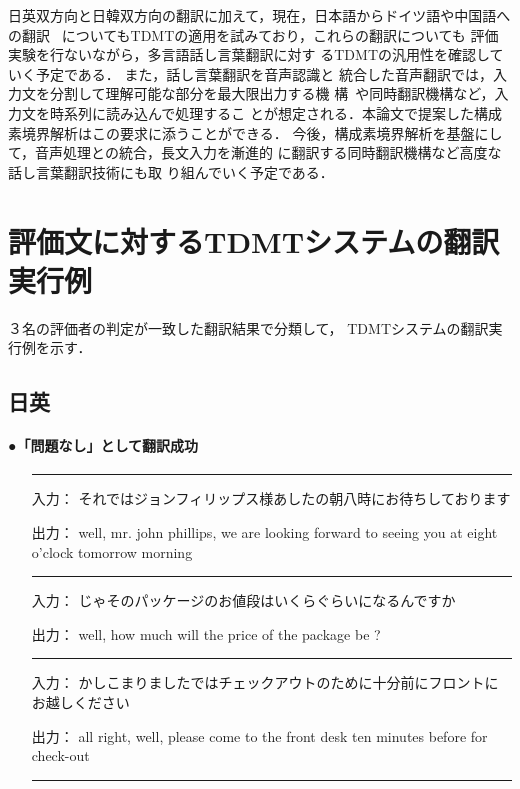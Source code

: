 日英双方向と日韓双方向の翻訳に加えて，現在，日本語からドイツ語や中国語への翻訳~\cite{Paul,Yamamoto99}
についてもTDMTの適用を試みており，これらの翻訳についても
評価実験を行ないながら，多言語話し言葉翻訳に対す
るTDMTの汎用性を確認していく予定である．
また，話し言葉翻訳を音声認識と
統合した音声翻訳では，入力文を分割して理解可能な部分を最大限出力する機
構~\cite{Furuse98}や同時翻訳機構など，入力文を時系列に読み込んで処理するこ
とが想定される．本論文で提案した構成素境界解析はこの要求に添うことができる．
今後，構成素境界解析を基盤にして，音声処理との統合，長文入力を漸進的
に翻訳する同時翻訳機構など高度な話し言葉翻訳技術にも取
り組んでいく予定である．




\clearpage
\appendix

\section{評価文に対するTDMTシステムの翻訳実行例}
\label{actual}

３名の評価者の判定が一致した翻訳結果で分類して，
TDMTシステムの翻訳実行例を示す．

\vspace{3mm}
\subsection{日英}

\paragraph{●「問題なし」として翻訳成功}

\begin{itemize}
\item[]\rule{132mm}{0.2mm}
\item[入力：]それではジョンフィリップス様あしたの朝八時にお待ちしております  
\item[出力：]well, mr. john phillips, we are looking forward to seeing you at eight o'clock tomorrow morning 
\item[]\rule{132mm}{0.2mm}
\item[入力：]じゃそのパッケージのお値段はいくらぐらいになるんですか
\item[出力：]well, how much will the price of the package be ? 
\item[]\rule{132mm}{0.2mm}
\item[入力：]かしこまりましたではチェックアウトのために十分前にフロントにお越しください    
\item[出力：]all right, well, please come to the front desk ten minutes before for check-out   
\item[]\rule{132mm}{0.2mm}
\end{itemize}

